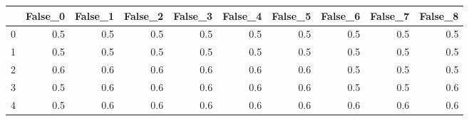 \begin{tabular}{lrrrrrrrrr}
\toprule
{} &  False\_0 &  False\_1 &  False\_2 &  False\_3 &  False\_4 &  False\_5 &  False\_6 &  False\_7 &  False\_8 \\ \hline
\midrule
0 &      0.5 &      0.5 &      0.5 &      0.5 &      0.5 &      0.5 &      0.5 &      0.5 &      0.5 \\ \hline
1 &      0.5 &      0.5 &      0.5 &      0.5 &      0.5 &      0.5 &      0.5 &      0.5 &      0.5 \\ \hline
2 &      0.6 &      0.6 &      0.6 &      0.6 &      0.6 &      0.6 &      0.5 &      0.5 &      0.5 \\ \hline
3 &      0.5 &      0.6 &      0.6 &      0.6 &      0.6 &      0.6 &      0.5 &      0.5 &      0.6 \\ \hline
4 &      0.5 &      0.6 &      0.6 &      0.6 &      0.6 &      0.6 &      0.6 &      0.6 &      0.6 \\ \hline
\bottomrule
\end{tabular}
